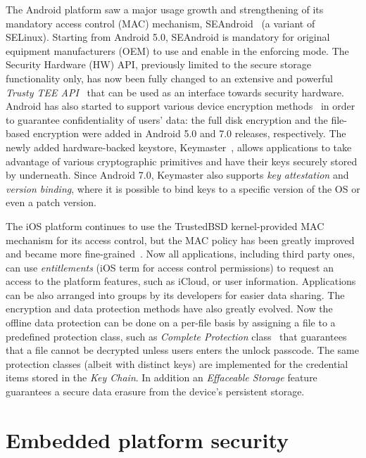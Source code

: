 The Android platform saw a major usage growth and strengthening of its mandatory access control (MAC) mechanism, SEAndroid~\cite{smalley12} (a variant of SELinux). Starting from Android 5.0, SEAndroid is mandatory for original equipment manufacturers (OEM) to use and enable in the enforcing mode. The Security Hardware (HW) API, previously limited to the secure storage functionality only, has now been fully changed to an extensive and powerful \textit{Trusty TEE API}~\cite{trusty} that can be used as an interface towards security hardware. Android has also started to support various device encryption methods~\cite{androidencr} in order to guarantee confidentiality of users' data: the full disk encryption and the file-based encryption were added in Android 5.0 and 7.0 releases, respectively. The newly added hardware-backed keystore, Keymaster~\cite{androidkeymaster}, allows applications to take advantage of various cryptographic primitives and have their keys securely stored by underneath. Since Android 7.0, Keymaster also supports \textit{key attestation} and \textit{version binding}, where it is possible to bind keys to a specific version of the OS or even a patch version. 

The iOS platform continues to use the TrustedBSD kernel-provided MAC mechanism for its access control, but the MAC policy has been greatly improved and became more fine-grained~\cite{iOS11}.  Now all applications, including third party ones, can use \textit{entitlements} (iOS term for access control permissions) to request an access to the platform features, such as iCloud, or user information. Applications can be also arranged into groups by its developers for easier data sharing. The encryption and data protection methods have also greatly evolved. Now the offline data protection can be done on a per-file basis by assigning a file to a predefined protection class, such as \textit{Complete Protection} class~\cite{iOS11} that guarantees that a file cannot be decrypted unless users enters the unlock passcode. The same protection classes (albeit with distinct keys) are implemented for the credential items stored in the \textit{Key Chain}. In addition an \textit{Effaceable Storage} feature~\cite{iOS11} guarantees a secure data erasure from the device's persistent storage. 

\section{Embedded platform security}

